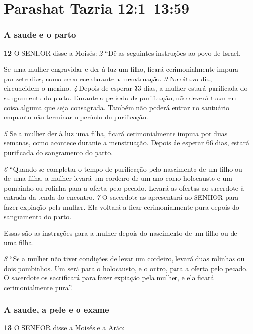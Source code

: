 \section*{Parashat Tazria 12:1–13:59}

\subsubsection*{A saude e o parto}
   
\textbf{\large 12}
 O SENHOR disse a Moisés: 
\textit{\tiny 2} 
“Dê as seguintes instruções ao povo de Israel. 

\smallskip
Se uma mulher engravidar e der à luz um filho, ficará cerimonialmente impura por
sete dias, como acontece durante a menstruação. 
\textit{\tiny 3} 
No oitavo dia, circuncidem o
menino. 
\textit{\tiny 4} 
Depois de esperar 33 dias, a mulher estará purificada do sangramento
do parto. Durante o período de purificação, não deverá tocar em coisa alguma que
seja consagrada. Também não poderá entrar no santuário enquanto não terminar
o período de purificação. 

\smallskip
\textit{\tiny 5} 
Se a mulher der à luz uma filha, ficará
cerimonialmente impura por duas semanas, como acontece durante a
menstruação. Depois de esperar 66 dias, estará purificada do sangramento do parto. 

\smallskip
\textit{\tiny 6} 
“Quando se completar o tempo de purificação pelo nascimento de um filho ou
de uma filha, a mulher levará um cordeiro de um ano como holocausto e um
pombinho ou rolinha para a oferta pelo pecado. Levará as ofertas ao sacerdote à
entrada da tenda do encontro. 
\textit{\tiny 7} 
O sacerdote as apresentará ao SENHOR para fazer
expiação pela mulher. Ela voltará a ficar cerimonialmente pura depois do
sangramento do parto. 

\smallskip
Essas são as instruções para a mulher depois do
nascimento de um filho ou de uma filha. 

\smallskip
\textit{\tiny 8} 
“Se a mulher não tiver condições de levar um cordeiro, levará duas rolinhas ou
dois pombinhos. Um será para o holocausto, e o outro, para a oferta pelo pecado.
O sacerdote os sacrificará para fazer expiação pela mulher, e ela ficará
cerimonialmente pura”.

  
\bigskip 
\subsubsection*{A saude, a pele e o exame}
\textbf{\large 13}
 O SENHOR disse a Moisés e a Arão: 

